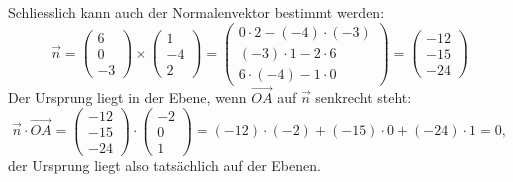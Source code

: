 \begin{loesung}
Schliesslich kann auch der Normalenvektor bestimmt werden:
\[
\vec n=
\begin{pmatrix}
6\\0\\-3
\end{pmatrix}
\times
\begin{pmatrix}
1\\-4\\2
\end{pmatrix}
=\begin{pmatrix}
0\cdot 2-(-4)\cdot(-3)\\
(-3)\cdot 1-2\cdot 6\\
6\cdot(-4)-1\cdot 0
\end{pmatrix}
=
\begin{pmatrix}
-12\\
-15\\
-24
\end{pmatrix}
\]
Der Ursprung liegt in der Ebene, wenn $\overrightarrow{OA}$ auf
$\vec n$ senkrecht steht:
\[
\vec n\cdot\overrightarrow{OA}
=
\begin{pmatrix}
-12\\ -15\\ -24 \end{pmatrix}
\cdot
\begin{pmatrix}
-2\\0\\1
\end{pmatrix}
=(-12)\cdot(-2)+(-15)\cdot 0+(-24)\cdot 1=0,
\]
der Ursprung liegt also tatsächlich auf der Ebenen.
\end{loesung}

